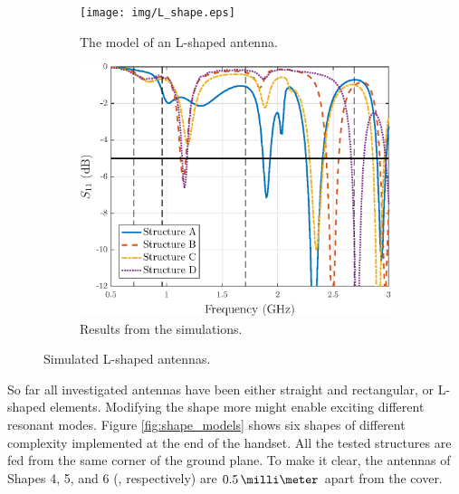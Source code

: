 \begin{figure}[H]
    \centering
    \begin{subfigure}[b]{0.49\textwidth}
        \texttt{[image: img/L\_shape.eps]}
        \caption{The model of an L-shaped antenna.}
        \label{fig:l_shape_model}
    \end{subfigure}
    \begin{subfigure}[b]{0.49\textwidth}
        \includegraphics[width=\textwidth]{img/L_shape_res.eps}
        \caption{Results from the simulations.}
        \label{fig:l_shape_res}
    \end{subfigure}
    \caption{Simulated L-shaped antennas.}
    \label{fig:l_shape}
\end{figure}

So far all investigated antennas have been either straight and rectangular, or L-shaped elements. Modifying the shape more might enable exciting different resonant modes. Figure \ref{fig:shape_models} shows six shapes of different complexity implemented at the end of the handset. All the tested structures are fed from the same corner of the ground plane. To make it clear, the antennas of Shapes 4, 5, and 6 (, respectively) are $0.5\,\milli\meter$ apart from the cover.

